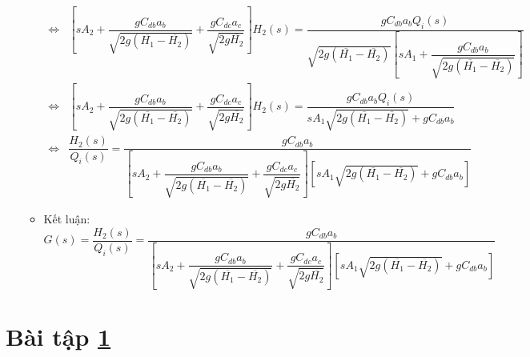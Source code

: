\documentclass[12pt,a4paper]{article}
\begin{document}
\begin{enumerate}[\it a.]
\begin{itemize}
\begin{align}
                            \Longleftrightarrow & \left[{s A_2 + \dfrac{g C_{db}a_b}{ \sqrt{2g(\overline{H_1} - \overline{H_2})}} + \dfrac{g C_{dc}a_c}{\sqrt{2g\overline{H_2}}} }\right] H_2 (s) = \dfrac{g C_{db}a_b Q_i(s)}{\sqrt{2g(\overline{H_1} - \overline{H_2})} \left[{s A_1 + \dfrac{gC_{db}a_b}{\sqrt{2g(\overline{H_1} - \overline{H_2})}}}\right]} \\
                            \Longleftrightarrow & \left[{s A_2 + \dfrac{g C_{db}a_b}{ \sqrt{2g(\overline{H_1} - \overline{H_2})}} + \dfrac{g C_{dc}a_c}{\sqrt{2g\overline{H_2}}} }\right] H_2 (s) = \dfrac{g C_{db}a_b Q_i(s)}{s A_1 \sqrt{2g(\overline{H_1} - \overline{H_2})} + gC_{db}a_b} \\
                            \Longleftrightarrow & \dfrac{H_2(s)}{Q_i(s)} = \dfrac{g C_{db}a_b}{\left[{s A_2 + \dfrac{g C_{db}a_b}{ \sqrt{2g(\overline{H_1} - \overline{H_2})}} + \dfrac{g C_{dc}a_c}{\sqrt{2g\overline{H_2}}} }\right]  \left[{ s A_1 \sqrt{2g(\overline{H_1} - \overline{H_2})} + gC_{db}a_b }\right]}
                        \end{align}

                    \item Kết luận: $G(s) = \dfrac{H_2(s)}{Q_i(s)} = \dfrac{g C_{db}a_b}{\left[{s A_2 + \dfrac{g C_{db}a_b}{ \sqrt{2g(\overline{H_1} - \overline{H_2})}} + \dfrac{g C_{dc}a_c}
                    {\sqrt{2g\overline{H_2}}} }\right]  \left[{ s A_1 \sqrt{2g(\overline{H_1} - \overline{H_2})} + gC_{db}a_b }\right]}$
                \end{itemize}
        \end{enumerate}


\section{Bài tập \ref{sec:baitap-2binh-2}} \label{sec:baitap-2binh-2}
\end{document}
